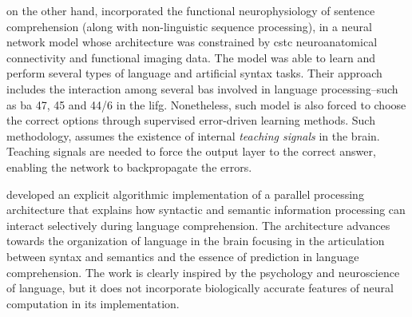 {\cite{Dominey2009NeuralNP} on the other hand, incorporated the functional neurophysiology of sentence comprehension (along with non-linguistic sequence processing), in a neural network model whose architecture was constrained by \gls{cstc} neuroanatomical connectivity and functional imaging data. The model was able to learn and perform several types of language and artificial syntax tasks. Their approach includes the interaction among several \glspl{ba} involved in language processing--such as \gls{ba} 47, 45 and 44/6 in the \gls{lifg}. Nonetheless, such model is also forced to choose the correct options through supervised error-driven learning methods. Such methodology, assumes the existence of internal \emph{teaching signals} in the brain. Teaching signals are needed to force the output layer to the correct answer, enabling the network to backpropagate the errors.

\cite{michalon_meaning-driven_2019} developed an explicit algorithmic implementation of a parallel processing architecture that explains how syntactic and semantic information processing can interact selectively during language comprehension. The architecture advances towards the organization of language in the brain focusing in the articulation between syntax and semantics and the essence of prediction in language comprehension. The work is clearly inspired by the psychology and neuroscience of language, but it does not incorporate biologically accurate features of neural computation in its implementation.

}
